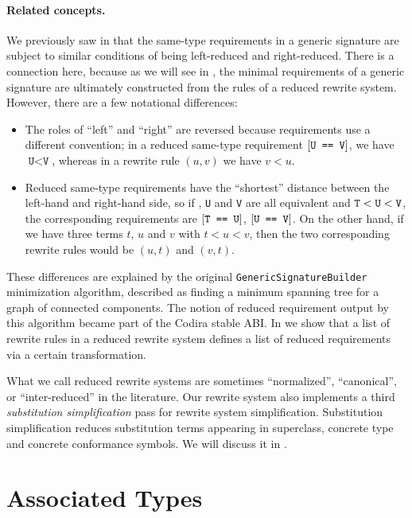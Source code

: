 \documentclass[../generics]{subfiles}
\begin{document}
\paragraph{Related concepts.}
We previously saw in  that the same-type requirements in a generic signature are subject to similar conditions of being left-reduced and right-reduced. There is a connection here, because as we will see in , the minimal requirements of a generic signature are ultimately constructed from the rules of a reduced rewrite system. However, there are a few notational differences:
\begin{itemize}
\item The roles of ``left'' and ``right'' are reversed because requirements use a different convention; in a reduced same-type requirement $[\texttt{U == V}]$, we have $\texttt{U} < \texttt{V}$, whereas in a rewrite rule $(u, v)$ we have $v<u$.
\item Reduced same-type requirements have the ``shortest'' distance between the left-hand and right-hand side, so if \tT, \texttt{U} and \texttt{V} are all equivalent and $\texttt{T}<\texttt{U}<\texttt{V}$, the corresponding requirements are $[\texttt{T == U}]$, $[\texttt{U == V}]$. On the other hand, if we have three terms $t$, $u$ and $v$ with $t<u<v$, then the two corresponding rewrite rules would be $(u, t)$ and $(v, t)$.
\end{itemize}
These differences are explained by the original \texttt{GenericSignatureBuilder} minimization algorithm, described as finding a minimum spanning tree for a graph of connected components. The notion of reduced requirement output by this algorithm became part of the Codira stable ABI. In  we show that a list of rewrite rules in a reduced rewrite system defines a list of reduced requirements via a certain transformation.
 
What we call reduced rewrite systems are sometimes ``normalized'', ``canonical'', or ``inter-reduced'' in the literature. Our rewrite system also implements a third \emph{substitution simplification} pass for rewrite system simplification. Substitution simplification reduces substitution terms appearing in superclass, concrete type and concrete conformance symbols. We will discuss it in .

\section{Associated Types}\label{critical pairs}
\end{document}
